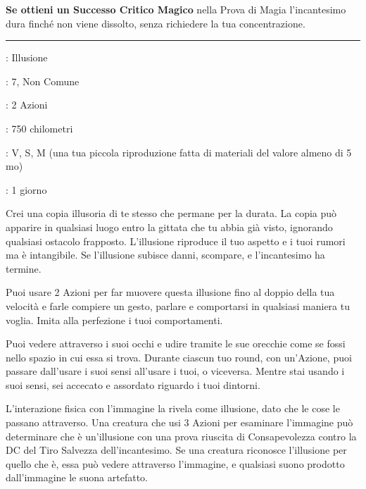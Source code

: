 \begin{multicols}{2}
\textbf{Se ottieni un Successo Critico Magico} nella Prova di Magia l'incantesimo dura finché non viene dissolto, senza richiedere la tua concentrazione.

\smallskip\noindent\rule{\linewidth}{2pt} \hypertarget{Immagine Proiettata}{}\smallskip{}
\noindent
\begin{description}[noitemsep, topsep=0pt, parsep=0pt, partopsep=0pt, leftmargin=0cm, labelwidth=2.8cm]
	\item[\textbf{Lista di Magia}]: Illusione
	\item[\textbf{Livello}]: 7, Non Comune
	\item[\textbf{T. di Lancio}]: 2 Azioni
	\item[\textbf{Gittata}]: 750 chilometri
	\item[\textbf{Componenti}]: V, S, M (una tua piccola riproduzione fatta di materiali del valore almeno di 5 mo)
	\item[\textbf{Durata}]: 1 giorno
\end{description}

Crei una copia illusoria di te stesso che permane per la durata. La copia può apparire in qualsiasi luogo entro la gittata che tu abbia già visto, ignorando qualsiasi ostacolo frapposto. L'illusione riproduce il tuo aspetto e i tuoi rumori ma è intangibile. Se l'illusione subisce danni, scompare, e l'incantesimo ha termine.

Puoi usare 2 Azioni per far muovere questa illusione fino al doppio della tua velocità e farle compiere un gesto, parlare e comportarsi in qualsiasi maniera tu voglia. Imita alla perfezione i tuoi comportamenti.

Puoi vedere attraverso i suoi occhi e udire tramite le sue orecchie come se fossi nello spazio in cui essa si trova. Durante ciascun tuo round, con un'Azione, puoi passare dall'usare i suoi sensi all'usare i tuoi, o viceversa. Mentre stai usando i suoi sensi, sei accecato e assordato riguardo i tuoi dintorni.

L'interazione fisica con l'immagine la rivela come illusione, dato che le cose le passano attraverso. Una creatura che usi 3 Azioni per esaminare l'immagine può determinare che è un'illusione con una prova riuscita di Consapevolezza contro la DC del Tiro Salvezza dell'incantesimo. Se una creatura riconosce l'illusione per quello che è, essa può vedere attraverso l'immagine, e qualsiasi suono prodotto dall'immagine le suona artefatto.


\end{multicols}
